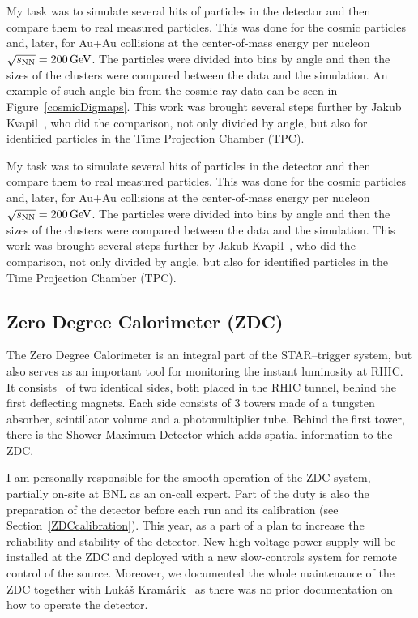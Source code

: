 My task was to simulate several hits of particles in the detector and then compare them to real measured particles. This was done for the cosmic particles and, later, for Au+Au collisions at the center-of-mass energy per nucleon $\sqrt{s_\text{NN}} = \SI{200}{\giga\electronvolt}$\@. The particles were divided into bins by angle and then the sizes of the clusters were compared between the data and the simulation. An example of such angle bin from the cosmic-ray data can be seen in Figure~\ref{cosmicDigmaps}.
This work was brought several steps further by Jakub Kvapil~\cite{KubaVyzkumak}, who did the comparison, not only divided by angle, but also for identified particles in the Time Projection Chamber (TPC).

My task was to simulate several hits of particles in the detector and then compare them to real measured particles. This was done for the cosmic particles and, later, for Au+Au collisions at the center-of-mass energy per nucleon $\sqrt{s_\text{NN}} = \SI{200}{\giga\electronvolt}$\@. The particles were divided into bins by angle and then the sizes of the clusters were compared between the data and the simulation.
This work was brought several steps further by Jakub Kvapil~\cite{KubaVyzkumak}, who did the comparison, not only divided by angle, but also for identified particles in the Time Projection Chamber (TPC).


\subsection*{Zero Degree Calorimeter (ZDC)}
The Zero Degree Calorimeter is an integral part of the STAR--trigger system, but also serves as an important tool for monitoring the instant luminosity at RHIC\@. It consists~\cite{ZDC, ZDCSMD} of two identical sides, both placed in the RHIC tunnel, behind 
the first deflecting magnets. Each side consists of 3 towers made of a tungsten absorber, scintillator volume and a photomultiplier tube.
Behind the first tower, there is the Shower-Maximum Detector which adds spatial information to the ZDC\@.

I am personally responsible for the smooth operation of the ZDC system, partially on-site at BNL as an on-call expert. Part of the duty is also the preparation of the detector before each run and its calibration (see Section~\ref{ZDCcalibration}). This year, as a part of a plan to increase the reliability and stability of the detector. New high-voltage power supply will be installed at the ZDC and deployed with a new slow-controls system for remote control of the source. Moreover, we documented the whole maintenance of the ZDC together with Lukáš Kramárik~\cite{ZDCmanual} as there was no prior documentation on how to operate the detector. 



